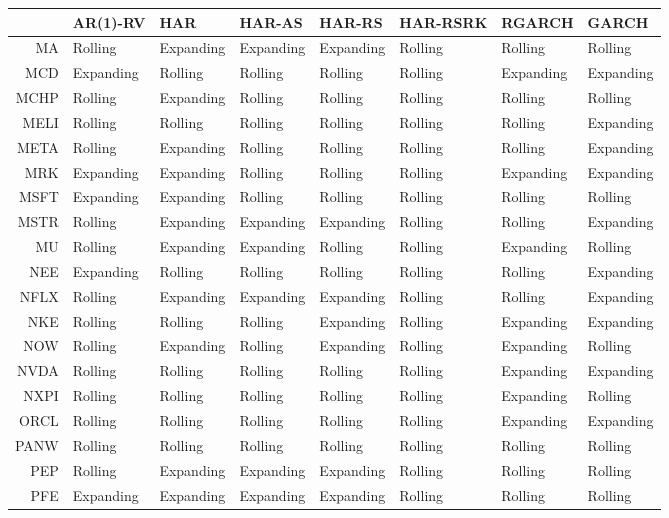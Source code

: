 \begin{table}[ht]
\centering
\begin{tabular}{rlllllll}
  \hline
 & AR(1)-RV & HAR & HAR-AS & HAR-RS & HAR-RSRK & RGARCH & GARCH \\ 
  \hline
MA & Rolling & Expanding & Expanding & Expanding & Rolling & Rolling & Rolling \\ 
  MCD & Expanding & Rolling & Rolling & Rolling & Rolling & Expanding & Expanding \\ 
  MCHP & Rolling & Expanding & Rolling & Rolling & Rolling & Rolling & Rolling \\ 
  MELI & Rolling & Rolling & Rolling & Rolling & Rolling & Rolling & Expanding \\ 
  META & Rolling & Expanding & Rolling & Rolling & Rolling & Rolling & Expanding \\ 
  MRK & Expanding & Expanding & Rolling & Rolling & Rolling & Expanding & Expanding \\ 
  MSFT & Expanding & Expanding & Rolling & Rolling & Rolling & Rolling & Rolling \\ 
  MSTR & Rolling & Expanding & Expanding & Expanding & Rolling & Rolling & Expanding \\ 
  MU & Rolling & Expanding & Expanding & Rolling & Rolling & Expanding & Rolling \\ 
  NEE & Expanding & Rolling & Rolling & Rolling & Rolling & Rolling & Expanding \\ 
  NFLX & Rolling & Expanding & Expanding & Expanding & Rolling & Rolling & Expanding \\ 
  NKE & Rolling & Rolling & Rolling & Expanding & Rolling & Expanding & Expanding \\ 
  NOW & Rolling & Expanding & Rolling & Expanding & Rolling & Expanding & Rolling \\ 
  NVDA & Rolling & Rolling & Rolling & Rolling & Rolling & Expanding & Expanding \\ 
  NXPI & Rolling & Rolling & Rolling & Rolling & Rolling & Expanding & Rolling \\ 
  ORCL & Rolling & Rolling & Rolling & Rolling & Rolling & Expanding & Expanding \\ 
  PANW & Rolling & Rolling & Rolling & Rolling & Rolling & Rolling & Rolling \\ 
  PEP & Rolling & Expanding & Expanding & Expanding & Rolling & Rolling & Rolling \\ 
  PFE & Expanding & Expanding & Expanding & Expanding & Rolling & Rolling & Rolling \\ 

\end{tabular}
\end{table}
